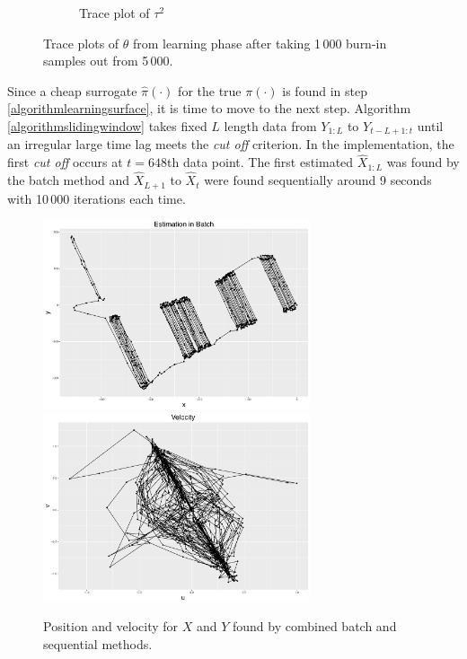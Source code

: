 \begin{figure}[h]
\begin{subfigure}[t]{0.45\textwidth}
	\caption{Trace plot of $\tau^2$}
\end{subfigure}
\caption{Trace plots of $\theta$ from learning phase after taking 1\,000 burn-in samples out from 5\,000. }
\end{figure}


Since a cheap surrogate $\hat{\pi}(\cdot)$ for the true $\pi(\cdot)$ is found in step \ref{algorithmlearningsurface}, it is time to move to the next step. Algorithm \ref{algorithmslidingwindow} takes fixed $L$ length data from $Y_{1:L}$ to $Y_{t-L+1:t}$ until an irregular large time lag meets the \textit{cut off} criterion. In the implementation, the first \textit{cut off} occurs at $t = 648$th data point. The first estimated $\hat{X}_{1:L}$ was found by the batch method and $\hat{X}_{L+1}$ to $\hat{X}_{t}$ were found sequentially around 9 seconds with 10\,000 iterations each time. 

\begin{figure}[h]
\centering
\includegraphics[width=0.7\textwidth]{Chapters/05MCMCOU/plots/realdatabatchPosition.pdf}
\includegraphics[width=0.7\textwidth]{Chapters/05MCMCOU/plots/realdatabatchVelocity.pdf}
\caption{Position and velocity for $X$ and $Y$ found by combined batch and sequential methods. }
\end{figure}

